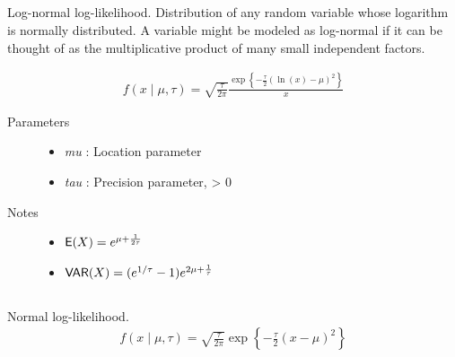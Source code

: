 \documentclass[]{jss}
\begin{document}
\subsection[lognormal]{}

Log-normal log-likelihood. Distribution of any random variable whose
logarithm is normally distributed. A variable might be modeled as
log-normal if it can be thought of as the multiplicative product of many
small independent factors.

\begin{eqnarray*}
    f(x \mid \mu, \tau) = \sqrt{\frac{\tau}{2\pi}}\frac{
    \exp\left\{ -\frac{\tau}{2} (\ln(x)-\mu)^2 \right\}}{x}    
\end{eqnarray*}

\begin{description}
\item[Parameters] \leavevmode\begin{itemize}

\item {} 
\emph{mu} : Location parameter

\item {} 
\emph{tau} : Precision parameter, \textgreater{} 0

\end{itemize}

\item[Notes] \leavevmode\begin{itemize}
    \item {}
    $\mathsf{E}(X)=e^{\mu+\frac{1}{2\tau}}$
    
    \item {}
    $\mathsf{VAR}(X)=(e^{1/\tau}-1)e^{2\mu+\frac{1}{\tau}}$
\end{itemize}

\end{description}


\subsection[normal]{}

Normal log-likelihood.
\begin{eqnarray*}
    f(x \mid \mu, \tau) = \sqrt{\frac{\tau}{2\pi}} \exp\left\{ -\frac{\tau}{2} (x-\mu)^2 \right\}
\end{eqnarray*}
\end{document}
